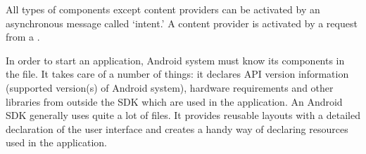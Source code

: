 All types of components except content providers can be activated by an asynchronous message called `intent.' A content provider is activated by a request from a .

In order to start an application, Android system must know its components in the  file. It takes care of a number of things: it declares API version information (supported version(s) of Android system), hardware requirements and other libraries from outside the SDK which are used in the application. An Android SDK generally uses quite a lot of  files. It provides reusable layouts with a detailed declaration of the user interface and creates a handy way of declaring resources used in the application.


